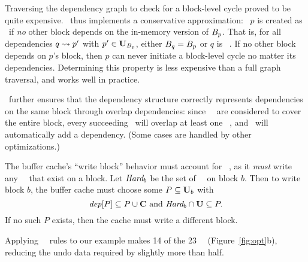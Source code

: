 Traversing the dependency graph to check for a block-level cycle
proved to be quite expensive.
%
\Kudos\ thus implements a conservative approximation: \patch\ $p$ is
created as \nrb\ if \emph{no} other block depends on the in-memory
version of $B_{p}$.
%
That is, for all dependencies $q \leadsto p'$ with $p' \in
\PMem[\PBlock{p}]$, either $B_{q} = B_{p}$ or $q$ is \anoop\
\patch.
%
If no other block depends on $p$'s block, then $p$ can never initiate a
block-level cycle no matter its dependencies.
%
Determining this property is less expensive than a full graph
traversal, and works well in practice.


\Kudos\ further ensures that the dependency structure correctly
represents dependencies on the same block through overlap
dependencies: since \nrb\ \patches\ are considered to cover the entire
block, every succeeding \patch\ will overlap at least one \nrb\ \patch,
and \Kudos\ will automatically add a dependency.
%
(Some cases are handled by other optimizations.)


The buffer cache's ``write block'' behavior must account for \nrb\
\patches, as it \emph{must} write any \nrb\ \patches\ that exist on a
block.
%
Let $\PHard[b]$ be the set of \nrb\ \patches\ on block $b$.
%
Then to write block $b$, the buffer cache must choose some $P \subseteq
\PMem[b]$ with
%
\[ \PDepset{P} \subseteq P \cup \PDisk \text{ and } \PHard[b] \cap \PMem
\subseteq P. \]
%
If no such $P$ exists, then the cache must write a different block.


Applying \nrb\ \patch\ rules to our example makes 14 of the 23 \patches\ \nrb\
(Figure~\ref{fig:opt}b),
%
reducing the undo data required by slightly more than half.


